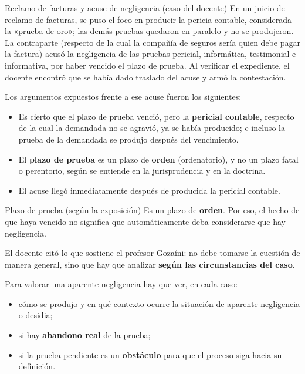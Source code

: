 \documentclass[12pt,oneside]{book}
\begin{document}
\begin{example}{Reclamo de facturas y acuse de negligencia (caso del docente)}
En un juicio de reclamo de facturas, se puso el foco en producir la pericia contable, considerada la «prueba de oro»; las demás pruebas quedaron en paralelo y no se produjeron. La contraparte (respecto de la cual la compañía de seguros sería quien debe pagar la factura) acusó la negligencia de las pruebas pericial, informática, testimonial e informativa, por haber vencido el plazo de prueba. Al verificar el expediente, el docente encontró que se había dado traslado del acuse y armó la contestación.
\end{example}

Los argumentos expuestos frente a ese acuse fueron los siguientes:

\begin{itemize}
    \item Es cierto que el plazo de prueba venció, pero la \textbf{pericial contable}, respecto de la cual la demandada no se agravió, ya se había producido; e incluso la prueba de la demandada se produjo después del vencimiento.
    \item El \textbf{plazo de prueba} es un plazo de \textbf{orden} (ordenatorio), y no un plazo fatal o perentorio, según se entiende en la jurisprudencia y en la doctrina.
    \item El acuse llegó inmediatamente después de producida la pericial contable.
\end{itemize}

\begin{definition}{Plazo de prueba (según la exposición)}
Es un plazo de \textbf{orden}. Por eso, el hecho de que haya vencido no significa que automáticamente deba considerarse que hay negligencia.
\end{definition}

El docente citó lo que sostiene el profesor Gozaíni: no debe tomarse la cuestión de manera general, sino que hay que analizar \textbf{según las circunstancias del caso}.

\begin{important}
Para valorar una aparente negligencia hay que ver, en cada caso:
\begin{itemize}
    \item cómo se produjo y en qué contexto ocurre la situación de aparente negligencia o desidia;
    \item si hay \textbf{abandono real} de la prueba;
    \item si la prueba pendiente es un \textbf{obstáculo} para que el proceso siga hacia su definición.
\end{itemize}
\end{important}
\end{document}

